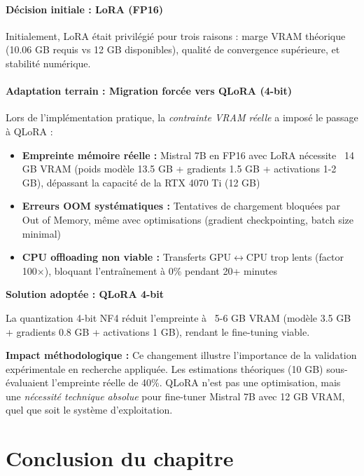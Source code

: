 \paragraph{Décision initiale : LoRA (FP16)}

Initialement, LoRA était privilégié pour trois raisons : marge VRAM théorique (10.06 GB requis vs 12 GB disponibles), qualité de convergence supérieure, et stabilité numérique.

\paragraph{Adaptation terrain : Migration forcée vers QLoRA (4-bit)}

Lors de l'implémentation pratique, la \textit{contrainte VRAM réelle} a imposé le passage à QLoRA :

\begin{itemize}
    \item \textbf{Empreinte mémoire réelle :} Mistral 7B en FP16 avec LoRA nécessite ~14 GB VRAM (poids modèle 13.5 GB + gradients 1.5 GB + activations 1-2 GB), dépassant la capacité de la RTX 4070 Ti (12 GB)
    
    \item \textbf{Erreurs OOM systématiques :} Tentatives de chargement bloquées par Out of Memory, même avec optimisations (gradient checkpointing, batch size minimal)
    
    \item \textbf{CPU offloading non viable :} Transferts GPU$\leftrightarrow$CPU trop lents (factor 100×), bloquant l'entraînement à 0\% pendant 20+ minutes
\end{itemize}

\textbf{Solution adoptée : QLoRA 4-bit}

La quantization 4-bit NF4 réduit l'empreinte à ~5-6 GB VRAM (modèle 3.5 GB + gradients 0.8 GB + activations 1 GB), rendant le fine-tuning viable.

\textbf{Impact méthodologique :} Ce changement illustre l'importance de la validation expérimentale en recherche appliquée. Les estimations théoriques (10 GB) sous-évaluaient l'empreinte réelle de 40\%. QLoRA n'est pas une optimisation, mais une \textit{nécessité technique absolue} pour fine-tuner Mistral 7B avec 12 GB VRAM, quel que soit le système d'exploitation.

\section{Conclusion du chapitre}

